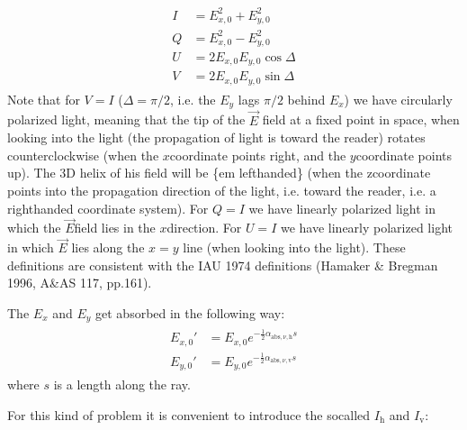 \documentclass[letterpaper,10pt,english]{sphinxmanual}
\begin{document}
\label{\detokenize{dustradtrans:eq-def-stokes-iquv}}\begin{equation*}
\begin{split}\begin{split}
I &= E_{x,0}^2+E_{y,0}^2\\
Q &= E_{x,0}^2-E_{y,0}^2\\
U &= 2E_{x,0}E_{y,0}\cos\Delta\\
V &= 2E_{x,0}E_{y,0}\sin\Delta
\end{split}\end{split}
\end{equation*}
Note that for \(V=I\) (\(\Delta=\pi/2\), i.e. the \(E_y\) lags
\(\pi/2\) behind \(E_x\)) we have  circularly polarized
light, meaning that the tip of the \(\vec E\) field at a fixed point in
space, when looking into the light (the propagation of light is toward the
reader) rotates counter\sphinxhyphen{}clockwise (when the \(x\)\sphinxhyphen{}coordinate points right,
and the \(y\)\sphinxhyphen{}coordinate points up). The 3\sphinxhyphen{}D helix of his field will be \{em
left\sphinxhyphen{}handed\} (when the z\sphinxhyphen{}coordinate points into the propagation direction of the
light, i.e. toward the reader, i.e. a right\sphinxhyphen{}handed coordinate system). For
\(Q=I\) we have linearly polarized light in which the \(\vec E\)\sphinxhyphen{}field
lies in the \(x\)\sphinxhyphen{}direction. For \(U=I\) we have linearly polarized
light in which \(\vec E\) lies along the \(x=y\) line (when looking into
the light). These definitions are consistent with the IAU 1974 definitions
(Hamaker \& Bregman 1996, A\&AS 117, pp.161).

The \(E_x\) and \(E_y\) get absorbed in the following way:
\begin{equation*}
\begin{split}\begin{split}
E_{x,0}' &= E_{x,0} e^{-\tfrac{1}{2}\alpha_{\mathrm{abs},\nu,\mathrm{h}}s}\\
E_{y,0}' &= E_{y,0} e^{-\tfrac{1}{2}\alpha_{\mathrm{abs},\nu,\mathrm{v}}s}
\end{split}\end{split}
\end{equation*}
where \(s\) is a length along the ray.

For this kind of problem it is convenient to introduce the so\sphinxhyphen{}called  \(I_{\mathrm{h}}\) and \(I_{\mathrm{v}}\):
\end{document}
